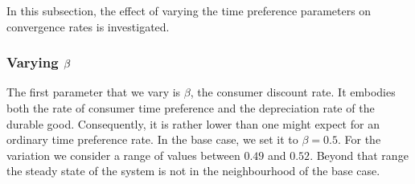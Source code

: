\label{sec:conv-across-param}

In this subsection, the effect of varying the time preference parameters on
convergence rates is investigated.

\subsubsection{Varying $\protect\beta$}

\label{sec:varying-beta}

The first parameter that we vary is $\beta $, the consumer discount rate. It
embodies both the rate of consumer time preference and the depreciation rate
of the durable good. Consequently, it is rather lower than one might expect
for an ordinary time preference rate. In the base case, we set it to $\beta
=0.5$. For the variation we consider a range of values between $0.49$ and $%
0.52$. Beyond that range the steady state of the system is not in the
neighbourhood of the base case.

